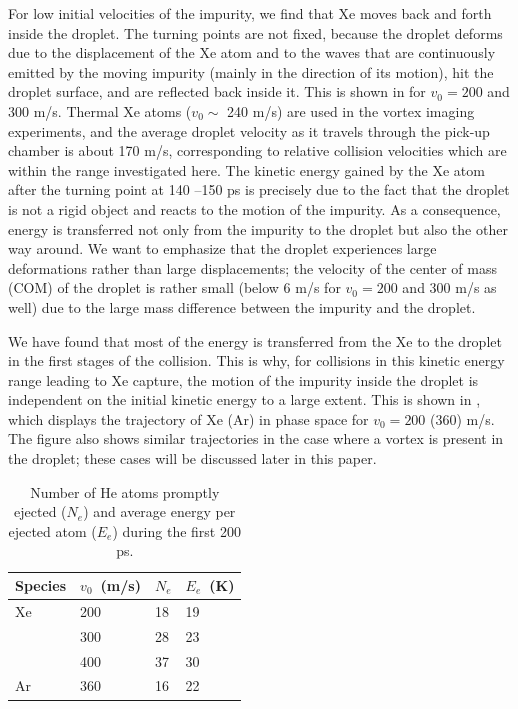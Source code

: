 For low initial velocities of the impurity, we find that
Xe moves back and forth inside the droplet.
The turning points are not fixed,
because the droplet deforms due to the displacement 
of the Xe atom and to the waves that are continuously emitted 
by the moving impurity
(mainly in the direction of its  motion),
hit the droplet surface, and are reflected back inside it\citep{Coppens2017-1}.
This is shown in 
 for $v_0= 200$  and 300 m/s. 
Thermal Xe atoms ($v_0 \sim$ 240 m/s) 
are used in the vortex imaging 
experiments\citep{Gom14,Jones2016}, and the average droplet velocity 
as it travels through the pick-up chamber is about 
170 m/s\citep{Gom11}, corresponding to relative collision
velocities which are within the range investigated here.
The kinetic energy gained by the Xe atom 
after the turning point at 140 --150 ps
is precisely due to the fact that the droplet is not a rigid 
object and reacts to the motion of the impurity.
As a consequence, energy is transferred not only from the impurity to 
the droplet but also the other way around. 
We want to emphasize that the droplet experiences 
large deformations rather than 
large displacements;
the velocity of the center of mass (COM) of the droplet is 
rather small (below 6 m/s  for $v_0= 200$ and 300 m/s as well) 
due to the large 
mass difference between the impurity and the droplet.

We have found that most of the energy is transferred from 
the Xe to the droplet in the first stages of the collision.
This is why, for collisions in this kinetic energy range 
leading to Xe capture, the motion of the impurity inside the droplet
is independent on the initial kinetic energy to a large extent.  
This is shown in , which displays the trajectory
of Xe (Ar) in phase space for $v_0= 200$ (360) m/s. 
The figure also shows similar trajectories in the case where a vortex 
is present in the droplet; these cases will be discussed later in this paper.

\begin{table}
	\caption{\label{tab1} Number of He atoms promptly ejected ($N_e$) and average energy per ejected atom ($E_e$) during the first 200 ps.}
	\begin{tabu} to \textwidth {X[c]X[c]X[c]X[c]}
		\toprule
		Species & $v_0$~(m/s) & $N_e$ & $E_e$~(K) \\
		\midrule
		Xe & 200 & 18 & 19 \\
		& 300 & 28 & 23   \\
		& 400 & 37 & 30 \\
		\midrule
		Ar & 360 & 16 & 22 \\
		\bottomrule 
	\end{tabu}
\end{table}

